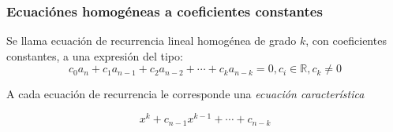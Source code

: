 \subsubsection{Ecuaciónes homogéneas a coeficientes constantes}
Se llama ecuación de recurrencia lineal homogénea de grado $k$, con coeficientes constantes, a una expresión del tipo:
\begin{equation*}
	c_0 a_n + c_1 a_{n-1} + c_2 a_{n-2} + \cdots + c_k a_{n-k} = 0 ,c_i \in \mathbb{R} , c_k \ne 0
\end{equation*}

A cada ecuación de recurrencia le corresponde una \emph{ecuación característica}

\begin{equation*}
	x^k + c_{n-1} x^{k-1} + \cdots + c_{n-k}
\end{equation*}

